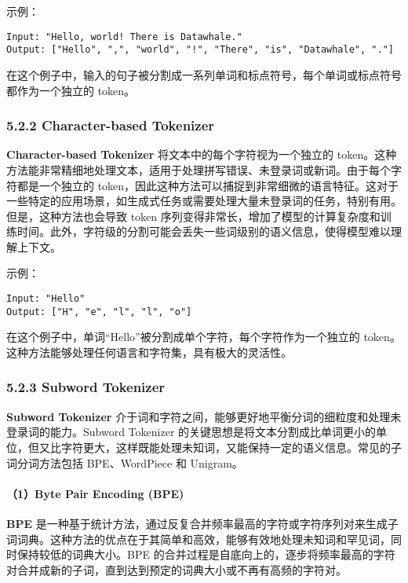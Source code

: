 \documentclass[12pt,a4paper]{book}
\begin{document}
示例：

\begin{verbatim}
Input: "Hello, world! There is Datawhale."
Output: ["Hello", ",", "world", "!", "There", "is", "Datawhale", "."]
\end{verbatim}

在这个例子中，输入的句子被分割成一系列单词和标点符号，每个单词或标点符号都作为一个独立的
token。

\subsubsection{5.2.2 Character-based
Tokenizer}\label{character-based-tokenizer}

\textbf{Character-based Tokenizer} 将文本中的每个字符视为一个独立的
token。这种方法能非常精细地处理文本，适用于处理拼写错误、未登录词或新词。由于每个字符都是一个独立的
token，因此这种方法可以捕捉到非常细微的语言特征。这对于一些特定的应用场景，如生成式任务或需要处理大量未登录词的任务，特别有用。但是，这种方法也会导致
token
序列变得非常长，增加了模型的计算复杂度和训练时间。此外，字符级的分割可能会丢失一些词级别的语义信息，使得模型难以理解上下文。

示例：

\begin{verbatim}
Input: "Hello"
Output: ["H", "e", "l", "l", "o"]
\end{verbatim}

在这个例子中，单词``Hello''被分割成单个字符，每个字符作为一个独立的
token。这种方法能够处理任何语言和字符集，具有极大的灵活性。

\subsubsection{5.2.3 Subword Tokenizer}\label{subword-tokenizer}

\textbf{Subword Tokenizer}
介于词和字符之间，能够更好地平衡分词的细粒度和处理未登录词的能力。Subword
Tokenizer
的关键思想是将文本分割成比单词更小的单位，但又比字符更大，这样既能处理未知词，又能保持一定的语义信息。常见的子词分词方法包括
BPE、WordPiece 和 Unigram。

\paragraph{（1）Byte Pair Encoding (BPE)}\label{byte-pair-encoding-bpe}

\textbf{BPE}
是一种基于统计方法，通过反复合并频率最高的字符或字符序列对来生成子词词典。这种方法的优点在于其简单和高效，能够有效地处理未知词和罕见词，同时保持较低的词典大小。BPE
的合并过程是自底向上的，逐步将频率最高的字符对合并成新的子词，直到达到预定的词典大小或不再有高频的字符对。
\end{document}
